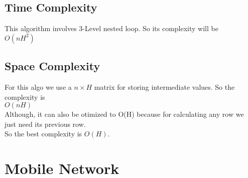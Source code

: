 \documentclass{article}
\begin{document}
\subsection{Time Complexity}
This algorithm involves 3-Level nested loop. So its complexity will be \\
\hspace*{2cm}$O(nH^2)$

\subsection{Space Complexity}
For this algo we use a $n \times H$ matrix for storing intermediate values. So the complexity is   \\
\hspace*{2cm}$O(nH)$  \\
Although, it can also be otimized to O(H) because for calculating any row we just need its previous row.\\
So the best complexity is $O(H)$.

\newpage
\section{Mobile Network}
\end{document}
